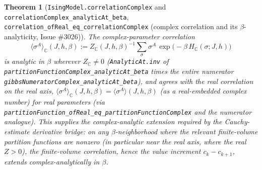 \documentclass[a4paper,11pt]{article}
\newtheorem{theorem}{Theorem}
\begin{document}
\begin{theorem}[\texttt{IsingModel.correlationComplex} and
\texttt{correlationComplex\_analyticAt\_beta},
\texttt{correlation\_ofReal\_eq\_correlationComplex} (complex correlation and its
$\beta$-analyticity, Issue \#3026)]
The complex-parameter correlation
\[
  \langle\sigma^A\rangle_{\mathbb{C}}(J,h,\beta)
    := Z_{\mathbb{C}}(J,h,\beta)^{-1}\sum_\sigma \sigma^A\,
        \exp\!\bigl(-\beta\,H_{\mathbb{C}}(\sigma;J,h)\bigr)
\]
is analytic in $\beta$ wherever $Z_{\mathbb{C}}\ne0$ (\texttt{AnalyticAt.inv} of
\texttt{partitionFunctionComplex\_analyticAt\_beta} times the entire numerator
\texttt{gibbsNumeratorComplex\_analyticAt\_beta}), and agrees with the real correlation on
the real axis, $\langle\sigma^A\rangle_{\mathbb{C}}(J,h,\beta)=
\langle\sigma^A\rangle(J,h,\beta)$ (as a real-embedded complex number) for real
parameters (via \texttt{partitionFunction\_ofReal\_eq\_partitionFunctionComplex} and the
numerator analogue). This supplies the complex-analytic extension required by the Cauchy-estimate
derivative bridge: on any $\beta$-neighborhood where the relevant finite-volume
partition functions are nonzero (in particular near the real axis, where the real
$Z>0$), the finite-volume correlation, hence the value increment $c_k-c_{k+1}$,
extends complex-analytically in $\beta$.
\end{theorem}
\end{document}
